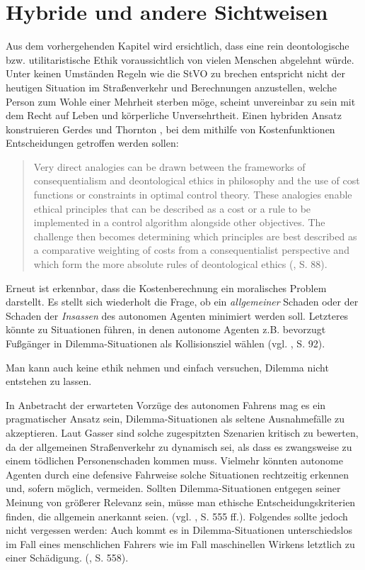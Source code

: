 \documentclass[a4paper, 12pt, titlepage]{scrartcl}
\begin{document}
\section{Hybride und andere Sichtweisen}
	Aus dem vorhergehenden Kapitel wird ersichtlich, dass eine rein deontologische bzw. utilitaristische Ethik voraussichtlich von vielen Menschen abgelehnt w\"urde. Unter keinen Umst\"anden Regeln wie die StVO zu brechen entspricht nicht der heutigen Situation im Stra\ss enverkehr und Berechnungen anzustellen, welche Person zum Wohle einer Mehrheit sterben m\"oge, scheint unvereinbar zu sein mit dem Recht auf Leben und k\"orperliche Unversehrtheit. Einen hybriden Ansatz konstruieren Gerdes und Thornton \autocite{Gerdes2015}, bei dem mithilfe von Kostenfunktionen Entscheidungen getroffen werden sollen:
	\begin{quote}
		\glqq Very direct analogies can be drawn between the frameworks of consequentialism and deontological ethics in philosophy and the use of cost functions or constraints in optimal control theory. These analogies enable ethical principles that can be described as a cost or a rule to be implemented in a control algorithm alongside other objectives. The challenge then becomes determining which principles are best described as a comparative weighting of costs from a consequentialist perspective and which form the more absolute rules of deontological ethics\grqq{} (\autocite{Gerdes2015}, S. 88).
	\end{quote}
	Erneut ist erkennbar, dass die Kostenberechnung ein moralisches Problem darstellt. Es stellt sich wiederholt die Frage, ob ein \emph{allgemeiner} Schaden oder der Schaden der \emph{Insassen} des autonomen Agenten minimiert werden soll. Letzteres k\"onnte zu Situationen f\"uhren, in denen autonome Agenten z.B. bevorzugt Fu\ss g\"anger in Dilemma-Situationen als Kollisionsziel w\"ahlen (vgl. \autocite{Gerdes2015}, S. 92).
	
	Man kann auch keine ethik nehmen und einfach versuchen, Dilemma nicht entstehen zu lassen. 
	
	In Anbetracht der erwarteten Vorz\"uge des autonomen Fahrens mag es ein pragmatischer Ansatz sein, Dilemma-Situationen als seltene Ausnahmef\"alle zu akzeptieren. Laut Gasser \autocite{Gasser2015} sind solche zugespitzten Szenarien kritisch zu bewerten, da der allgemeinen Stra\ss enverkehr zu dynamisch sei, als dass es zwangsweise zu einem t\"odlichen Personenschaden kommen muss. Vielmehr k\"onnten autonome Agenten durch eine defensive Fahrweise solche Situationen rechtzeitig erkennen und, sofern m\"oglich, vermeiden. Sollten Dilemma-Situationen entgegen seiner Meinung von gr\"o\ss erer Relevanz sein, m\"usse man ethische Entscheidungskriterien finden, die allgemein anerkannt seien. (vgl. \autocite{Gasser2015}, S. 555 ff.). Folgendes sollte jedoch nicht vergessen werden: \glqq Auch kommt es in \glq Dilemma-Situationen\grq{} unterschiedslos im Fall eines menschlichen Fahrers wie im Fall maschinellen Wirkens letztlich zu einer Schädigung.\grqq{} (\autocite{Gasser2015}, S. 558).
	
\end{document}
